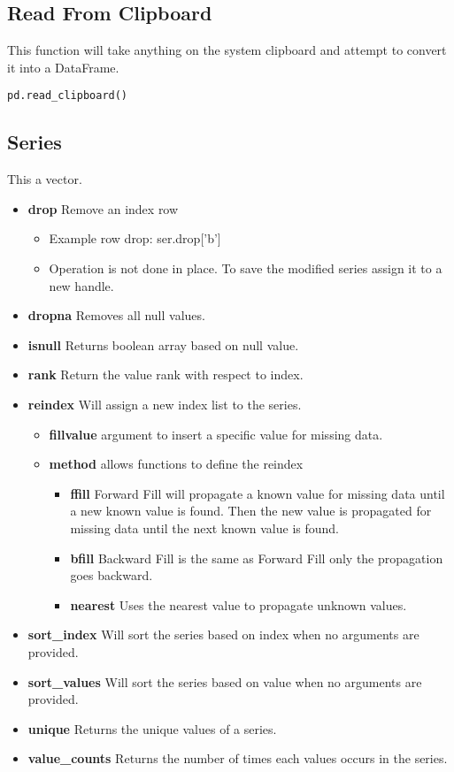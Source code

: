 \subsection{Read From Clipboard}
This function will take anything on the system clipboard and attempt to convert
it into a DataFrame.
\begin{lstlisting}
pd.read_clipboard()
\end{lstlisting}

\subsection{Series}
This a vector.
\begin{itemize}
  \item \textbf{drop} Remove an index row
    \begin{itemize}
      \item Example row drop: ser.drop['b']
      \item Operation is not done in place.  To save the modified series
        assign it to a new handle.
    \end{itemize}
  \item \textbf{dropna} Removes all null values.
  \item \textbf{isnull} Returns boolean array based on null value.
  \item \textbf{rank} Return the value rank with respect to index.
  \item \textbf{reindex} Will assign a new index list to the series.
    \begin{itemize}
      \item \textbf{fill\textunderscore value} argument to insert a specific
        value for missing data.
      \item \textbf{method} allows functions to define the reindex
        \begin{itemize}
          \item \textbf{ffill} Forward Fill will propagate a known value for
            missing data until a new known value is found.  Then the new value
            is propagated for missing data until the next known value is found.
          \item \textbf{bfill} Backward Fill is the same as Forward Fill only
            the propagation goes backward.
          \item \textbf{nearest} Uses the nearest value to propagate unknown
            values.
        \end{itemize}
    \end{itemize}
  \item \textbf{sort\_index} Will sort the series based on index when no
    arguments are provided.
  \item \textbf{sort\_values} Will sort the series based on value when no
    arguments are provided.
  \item \textbf{unique} Returns the unique values of a series.
  \item \textbf{value\_counts} Returns the number of times each values occurs
    in the series.
\end{itemize}

